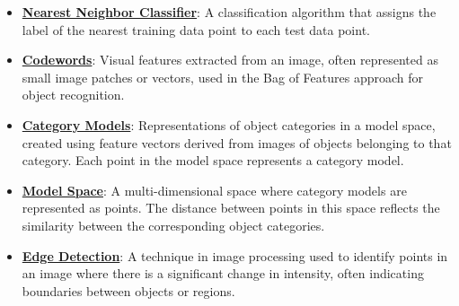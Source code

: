 \documentclass{article}%
\begin{document}
\begin{itemize}[leftmargin=*]
\item \href{https://purdue.brightspace.com/d2l/common/assets/pdfjs-d2l-dist/1.0.14-legacy/web/viewer.html?file=\%2Fcontent\%2Fenforced\%2F1095467-wl.202510.CS.24300.001\%2F07L2-Vision.pdf\%3Fou\%3D1095467\&lang=en-us\&container=d2l-fileviewer-rendered-pdf\&fullscreen=d2l-fileviewer-rendered-pdf-dialog\&height=667#page=30}{\textbf{Nearest Neighbor Classifier}}: A classification algorithm that assigns the label of the nearest training data point to each test data point.%
\end{itemize}%
\begin{itemize}[leftmargin=*]%
\item \href{https://purdue.brightspace.com/d2l/common/assets/pdfjs-d2l-dist/1.0.14-legacy/web/viewer.html?file=\%2Fcontent\%2Fenforced\%2F1095467-wl.202510.CS.24300.001\%2F08L2-Feature Extraction.pdf\%3Fou\%3D1095467\&lang=en-us\&container=d2l-fileviewer-rendered-pdf\&fullscreen=d2l-fileviewer-rendered-pdf-dialog\&height=667#page=2}{\textbf{Codewords}}: Visual features extracted from an image, often represented as small image patches or vectors, used in the Bag of Features approach for object recognition.%
\item \href{https://purdue.brightspace.com/d2l/common/assets/pdfjs-d2l-dist/1.0.14-legacy/web/viewer.html?file=\%2Fcontent\%2Fenforced\%2F1095467-wl.202510.CS.24300.001\%2F08L2-Feature Extraction.pdf\%3Fou\%3D1095467\&lang=en-us\&container=d2l-fileviewer-rendered-pdf\&fullscreen=d2l-fileviewer-rendered-pdf-dialog\&height=667#page=3}{\textbf{Category Models}}: Representations of object categories in a model space, created using feature vectors derived from images of objects belonging to that category. Each point in the model space represents a category model.%
\item \href{https://purdue.brightspace.com/d2l/common/assets/pdfjs-d2l-dist/1.0.14-legacy/web/viewer.html?file=\%2Fcontent\%2Fenforced\%2F1095467-wl.202510.CS.24300.001\%2F08L2-Feature Extraction.pdf\%3Fou\%3D1095467\&lang=en-us\&container=d2l-fileviewer-rendered-pdf\&fullscreen=d2l-fileviewer-rendered-pdf-dialog\&height=667#page=3}{\textbf{Model Space}}: A multi-dimensional space where category models are represented as points. The distance between points in this space reflects the similarity between the corresponding object categories.%
\item \href{https://purdue.brightspace.com/d2l/common/assets/pdfjs-d2l-dist/1.0.14-legacy/web/viewer.html?file=\%2Fcontent\%2Fenforced\%2F1095467-wl.202510.CS.24300.001\%2F08L2-Feature Extraction.pdf\%3Fou\%3D1095467\&lang=en-us\&container=d2l-fileviewer-rendered-pdf\&fullscreen=d2l-fileviewer-rendered-pdf-dialog\&height=667#page=4}{\textbf{Edge Detection}}: A technique in image processing used to identify points in an image where there is a significant change in intensity, often indicating boundaries between objects or regions.%

\end{itemize}
\end{document}
